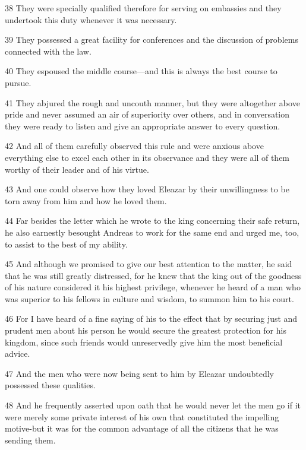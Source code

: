 \par 38 They were specially qualified therefore for serving on embassies and they undertook this duty whenever it was necessary.

\par 39 They possessed a great facility for conferences and the discussion of problems connected with the law.

\par 40 They espoused the middle course—and this is always the best course to pursue.

\par 41 They abjured the rough and uncouth manner, but they were altogether above pride and never assumed an air of superiority over others, and in conversation they were ready to listen and give an appropriate answer to every question.

\par 42 And all of them carefully observed this rule and were anxious above everything else to excel each other in its observance and they were all of them worthy of their leader and of his virtue.

\par 43 And one could observe how they loved Eleazar by their unwillingness to be torn away from him and how he loved them.

\par 44 Far besides the letter which he wrote to the king concerning their safe return, he also earnestly besought Andreas to work for the same end and urged me, too, to assist to the best of my ability.

\par 45 And although we promised to give our best attention to the matter, he said that he was still greatly distressed, for he knew that the king out of the goodness of his nature considered it his highest privilege, whenever he heard of a man who was superior to his fellows in culture and wisdom, to summon him to his court.

\par 46 For I have heard of a fine saying of his to the effect that by securing just and prudent men about his person he would secure the greatest protection for his kingdom, since such friends would unreservedly give him the most beneficial advice.

\par 47 And the men who were now being sent to him by Eleazar undoubtedly possessed these qualities.

\par 48 And he frequently asserted upon oath that he would never let the men go if it were merely some private interest of his own that constituted the impelling motive-but it was for the common advantage of all the citizens that he was sending them.

